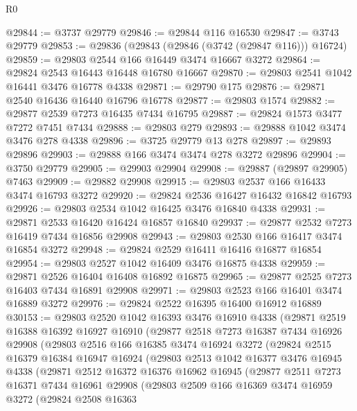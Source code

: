 \begin{lexlean}{R0}
\begin{coremodule}
@29844 := @3737 @29779
@29846 := @29844 @116 @16530
@29847 := @3743 @29779
@29853 := @29836 (@29843 (@29846 (@3742 (@29847 @116))) @16724)
@29859 := @29803 @2544 @166 @16449 @3474 @16667 @3272
@29864 := @29824 @2543 @16443 @16448 @16780 @16667
@29870 := @29803 @2541 @1042 @16441 @3476 @16778 @4338
@29871 := @29790 @175
@29876 := @29871 @2540 @16436 @16440 @16796 @16778
@29877 := @29803 @1574
@29882 := @29877 @2539 @7273 @16435 @7434 @16795
@29887 := @29824 @1573 @3477 @7272 @7451 @7434
@29888 := @29803 @279
@29893 := @29888 @1042 @3474 @3476 @278 @4338
@29896 := @3725 @29779 @13 @278
@29897 := @29893 @29896
@29903 := @29888 @166 @3474 @3474 @278 @3272 @29896
@29904 := @3750 @29779
@29905 := @29903 @29904
@29908 := @29887 (@29897 @29905) @7463
@29909 := @29882 @29908
@29915 := @29803 @2537 @166 @16433 @3474 @16793 @3272
@29920 := @29824 @2536 @16427 @16432 @16842 @16793
@29926 := @29803 @2534 @1042 @16425 @3476 @16840 @4338
@29931 := @29871 @2533 @16420 @16424 @16857 @16840
@29937 := @29877 @2532 @7273 @16419 @7434 @16856 @29908
@29943 := @29803 @2530 @166 @16417 @3474 @16854 @3272
@29948 := @29824 @2529 @16411 @16416 @16877 @16854
@29954 := @29803 @2527 @1042 @16409 @3476 @16875 @4338
@29959 := @29871 @2526 @16404 @16408 @16892 @16875
@29965 := @29877 @2525 @7273 @16403 @7434 @16891 @29908
@29971 := @29803 @2523 @166 @16401 @3474 @16889 @3272
@29976 := @29824 @2522 @16395 @16400 @16912 @16889
@30153 := @29803
    @2520
    @1042
    @16393
    @3476
    @16910
    @4338
    (@29871
      @2519
      @16388
      @16392
      @16927
      @16910
      (@29877
        @2518
        @7273
        @16387
        @7434
        @16926
        @29908
        (@29803
          @2516
          @166
          @16385
          @3474
          @16924
          @3272
          (@29824
            @2515
            @16379
            @16384
            @16947
            @16924
            (@29803
              @2513
              @1042
              @16377
              @3476
              @16945
              @4338
              (@29871
                @2512
                @16372
                @16376
                @16962
                @16945
                (@29877
                  @2511
                  @7273
                  @16371
                  @7434
                  @16961
                  @29908
                  (@29803
                    @2509
                    @166
                    @16369
                    @3474
                    @16959
                    @3272
                    (@29824
                      @2508
                      @16363

\end{coremodule}
\end{lexlean}
